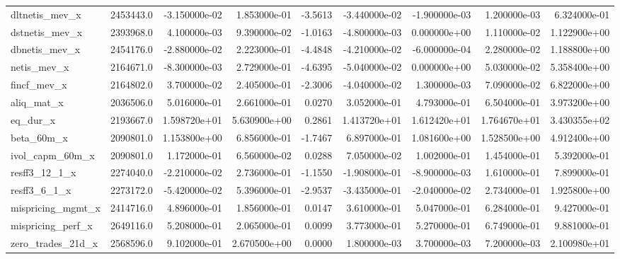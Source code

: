 \documentclass[10pt]{article}
\begin{document}
\begin{landscape}
\begin{longtable}{|l|r|r|r|r|r|r|r|r|}
dltnetis\_mev\_x          &  2453443.0 & -3.150000e-02 &  1.853000e-01 &     -3.5613 & -3.440000e-02 & -1.900000e-03 &  1.200000e-03 &  6.324000e-01 \\
dstnetis\_mev\_x          &  2393968.0 &  4.100000e-03 &  9.390000e-02 &     -1.0163 & -4.800000e-03 &  0.000000e+00 &  1.110000e-02 &  1.122900e+00 \\
dbnetis\_mev\_x           &  2454176.0 & -2.880000e-02 &  2.223000e-01 &     -4.4848 & -4.210000e-02 & -6.000000e-04 &  2.280000e-02 &  1.188800e+00 \\
netis\_mev\_x             &  2164671.0 & -8.300000e-03 &  2.729000e-01 &     -4.6395 & -5.040000e-02 &  0.000000e+00 &  5.030000e-02 &  5.358400e+00 \\
fincf\_mev\_x             &  2164802.0 &  3.700000e-02 &  2.405000e-01 &     -2.3006 & -4.040000e-02 &  1.300000e-03 &  7.090000e-02 &  6.822000e+00 \\
aliq\_mat\_x              &  2036506.0 &  5.016000e-01 &  2.661000e-01 &      0.0270 &  3.052000e-01 &  4.793000e-01 &  6.504000e-01 &  3.973200e+00 \\
eq\_dur\_x                &  2193667.0 &  1.598720e+01 &  5.630900e+00 &      0.2861 &  1.413720e+01 &  1.612420e+01 &  1.764670e+01 &  3.430355e+02 \\
beta\_60m\_x              &  2090801.0 &  1.153800e+00 &  6.856000e-01 &     -1.7467 &  6.897000e-01 &  1.081600e+00 &  1.528500e+00 &  4.912400e+00 \\
ivol\_capm\_60m\_x         &  2090801.0 &  1.172000e-01 &  6.560000e-02 &      0.0288 &  7.050000e-02 &  1.002000e-01 &  1.454000e-01 &  5.392000e-01 \\
resff3\_12\_1\_x           &  2274040.0 & -2.210000e-02 &  2.736000e-01 &     -1.1550 & -1.908000e-01 & -8.900000e-03 &  1.610000e-01 &  7.899000e-01 \\
resff3\_6\_1\_x            &  2273172.0 & -5.420000e-02 &  5.396000e-01 &     -2.9537 & -3.435000e-01 & -2.040000e-02 &  2.734000e-01 &  1.925800e+00 \\
mispricing\_mgmt\_x       &  2414716.0 &  4.896000e-01 &  1.856000e-01 &      0.0147 &  3.610000e-01 &  5.047000e-01 &  6.284000e-01 &  9.427000e-01 \\
mispricing\_perf\_x       &  2649116.0 &  5.208000e-01 &  2.065000e-01 &      0.0099 &  3.773000e-01 &  5.270000e-01 &  6.749000e-01 &  9.881000e-01 \\
zero\_trades\_21d\_x       &  2568596.0 &  9.102000e-01 &  2.670500e+00 &      0.0000 &  1.800000e-03 &  3.700000e-03 &  7.200000e-03 &  2.100980e+01 \\

\end{longtable}
\end{landscape}
\end{document}
